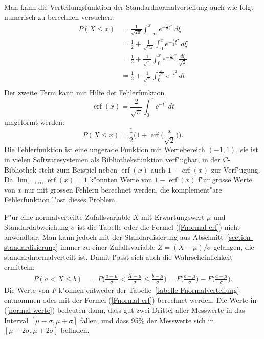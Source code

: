 Man kann die Verteilungsfunktion der Standardnormalverteilung auch wie folgt
numerisch zu berechnen versuchen:
\begin{equation}
\begin{aligned}
P(X\le x)
&=\frac1{\sqrt{2\pi}}\int_{-\infty}^xe^{-\frac12\xi^2}\,d\xi\\
&=\frac12+\frac1{\sqrt{2\pi}}\int_0^xe^{-\frac12\xi^2}\,d\xi\\
&=\frac12+\frac1{\sqrt{\pi}}\int_0^xe^{-\frac12\xi^2}\,\frac{d\xi}{\sqrt{2}}\\
&=\frac12+\frac1{\sqrt{\pi}}\int_0^{\frac{x}{\sqrt{2}}}e^{-t^2}\,dt\\
\end{aligned}
\label{normal-werte}
\end{equation}
Der zweite Term kann mit Hilfe der Fehlerfunktion 
\[
\operatorname{erf}(x)=\frac{2}{\sqrt{\pi}}\int_0^xe^{-t^2}\,dt
\]
umgeformt werden:
\begin{equation}
P(X\le x)=\frac12\biggl(1+\operatorname{erf}\biggl(\frac{x}{\sqrt{2}}\biggr)\biggr).
\label{Fnormal-erf}
\end{equation}
%
%
Die Fehlerfunktion ist eine ungerade Funktion mit Wertebereich $(-1,1)$,
sie ist in vielen Softwaresystemen als Bibliotheksfunktion verf"ugbar, in
der C-Bibliothek steht zum Beispiel neben $\operatorname{erf}(x)$ auch
$1-\operatorname{erf}(x)$ zur Verf"ugung.
Da $\lim_{x\to\infty}\operatorname{erf}(x)=1$ k"onnten Werte von
$1-\operatorname{erf}(x)$ f"ur grosse Werte von $x$ nur mit grossen Fehlern 
berechnet werden, die komplement"are Fehlerfunktion l"ost dieses Problem.

F"ur eine normalverteilte Zufallsvariable $X$ mit Erwartungswert $\mu$ und
Standardabweichung $\sigma$ ist die Tabelle oder die Formel (\ref{Fnormal-erf})
nicht anwendbar. 
Man kann jedoch mit der Standardisierung aus Abschnitt~\ref{section-standardisierung}
immer zu einer Zufallsvariable $Z=(X-\mu)/\sigma$ gelangen, die
standardnormalverteilt ist.
Damit l"asst sich auch die Wahrscheinlichkeit ermitteln:
\begin{align*}
P(a<X\le b)
&=
P\biggl(\frac{a-\mu}{\sigma}<\frac{X-\mu}{\sigma}\le \frac{b-\mu}{\sigma}\biggr)
=
F\biggl(\frac{b-\mu}{\sigma}\biggr)
-
F\biggl(\frac{a-\mu}{\sigma}\biggr).
\end{align*}
Die Werte von $F$ k"onnen entweder der Tabelle~\ref{tabelle-Fnormalverteilung}
entnommen oder mit der Formel (\ref{Fnormal-erf}) berechnet werden.
Die Werte in (\ref{normal-werte}) bedeuten dann, dass gut zwei Drittel aller
Messwerte in das Interval $[\mu-\sigma, \mu+\sigma]$ fallen, und dass 
95\% der Messwerte sich in $[\mu-2\sigma,\mu+2\sigma]$ befinden.

